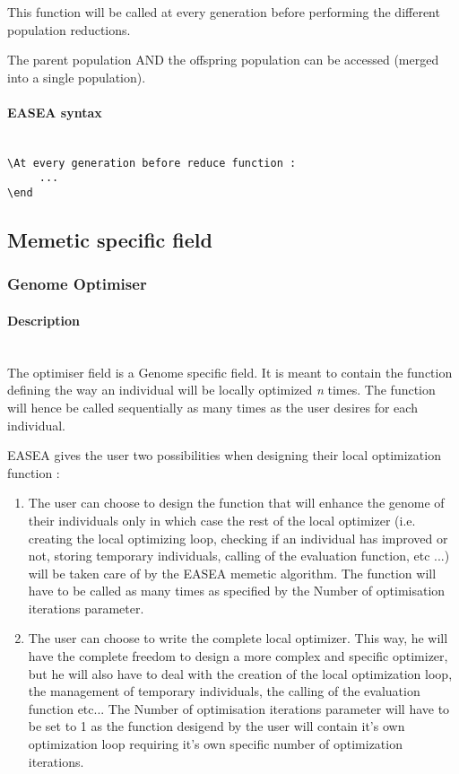 \documentclass{book}
\begin{document}
This function will be called at every generation before performing the
different population reductions.

The parent population AND the offspring population can be accessed
(merged into a single population).

\paragraph{EASEA syntax}\label{easea-syntax-8}
~\\

\texttt{\textbackslash{}At~every~generation~before~reduce~function~:}\\\texttt{~~~~~...}\\\texttt{\textbackslash{}end}

\subsection{Memetic specific field}\label{memetic-specific-field}

\subsubsection{Genome Optimiser}\label{genome-optimiser}

\paragraph{Description}\label{description-9}
~\\

The optimiser field is a Genome specific field. It is meant to contain
the function defining the way an individual will be locally optimized
\emph{n} times. The function will hence be called sequentially as many
times as the user desires for each individual.

EASEA gives the user two possibilities when designing their local
optimization function :

\begin{enumerate}
\itemsep1pt\parskip0pt
\item
  The user can choose to design the function that will enhance the
  genome of their individuals only in which case the rest of the local
  optimizer (i.e. creating the local optimizing loop, checking if an
  individual has improved or not, storing temporary individuals, calling
  of the evaluation function, etc ...) will be taken care of by the
  EASEA memetic algorithm. The function will have to be called as many
  times as specified by the
  Number of optimisation iterations parameter.
\item
  The user can choose to write the complete local optimizer. This way,
  he will have the complete freedom to design a more complex and
  specific optimizer, but he will also have to deal with the creation of
  the local optimization loop, the management of temporary individuals,
  the calling of the evaluation function etc... The
  Number of optimisation iterations parameter will have to be set to 1 as the
  function desigend by the user will contain it's own optimization loop
  requiring it's own specific number of optimization iterations.
\end{enumerate}
\end{document}
